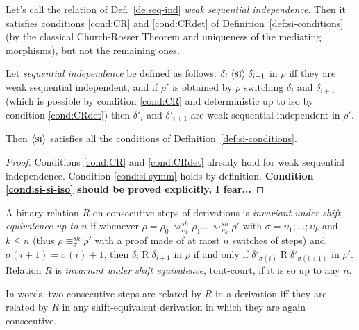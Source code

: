 \documentclass{llncs}
\newcommand{\perm}{\sigma}
\newcommand{\shiftdir}[1][]{\ensuremath{\mathrel{{\rightsquigarrow}^{\mathit{sh}}_{#1}}}}
\newcommand{\shifteq}[1][]{\ensuremath{\mathrel{{\equiv}^\mathit{sh}_{#1}}}}
\begin{document}
\begin{proposition}
Let's call the relation of Def.~\ref{de:seq-ind} \emph{weak sequential independence}. Then it satisfies conditions \ref{cond:CR} and \ref{cond:CRdet} of Definition~\ref{def:si-conditions} (by the classical Church-Rosser Theorem and uniqueness of the mediating morphisms), but not the remaining ones. 

Let \emph{sequential independence} be defined as follows: $\delta_i \mathrel{\langle \mbox{\textsc{si}}\rangle} \delta_{i+1}$ in $\rho$ iff they are weak sequential independent, and if $\rho'$ is obtained by $\rho$ switching  $\delta_i$ and $\delta_{i+1}$ (which is possible by condition \ref{cond:CR} and deterministic up to iso by condition \ref{cond:CRdet}) then $\delta'_i$ and $\delta'_{i+1}$ are weak sequential independent in $\rho'$.
 
 Then $\mathrel{\langle \mbox{\textsc{si}}\rangle}$ satisfies all the conditions of Definition~\ref{def:si-conditions}.
 \end{proposition}
 
\begin{proof}
Conditions  \ref{cond:CR} and \ref{cond:CRdet} already hold for weak sequential independence. Condition \ref{cond:si-symm} holds by definition. \textbf{Condition \ref{cond:si-si-iso} should be proved explicitly, I fear...}
\end{proof}


\begin{definition}
\label{def:invariance} 
A binary relation $R$ on consecutive steps of derivations is \emph{invariant under shift equivalence up to $n$} if whenever  $\rho = \rho_0 \shiftdir[\upsilon_1] \rho_1 \ldots \shiftdir[\upsilon_k] \rho'$ with  $\perm = \upsilon_1; \ldots; \upsilon_k$ and $k \leq n$ (thus $\rho \shifteq[\perm] \rho'$ with a proof made of at most  $n$ switches of steps) and $\perm(i+1) = \perm(i) + 1$, then $\delta_i \mathrel{R} \delta_{i+1}$ in $\rho$ if and only if $\delta'_{\perm(i)} \mathrel{R} \delta'_{\perm(i+1)}$ in $\rho'$. Relation $R$  is \emph{invariant under shift equivalence}, tout-court, if it is so up to any $n$.

In words, two consecutive steps are related by $R$ in a derivation iff they are related by $R$ in any shift-equivalent derivation in which they are again consecutive. 



\end{definition}
\end{document}
